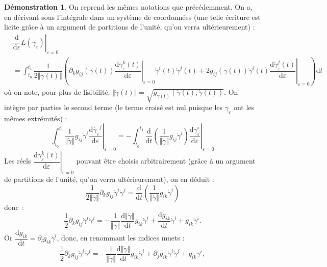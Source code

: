 \documentclass[12pt,a4paper]{article}
\theoremstyle{definition}
\newtheorem*{dem}{Démonstration}
\begin{document}
\begin{dem}
On reprend les mêmes notations que précédemment.\newline
On a, en dérivant sous l'intégrale dans un système de coordonnées (une telle écriture est licite grâce à un argument de partitions de l'unité, qu'on verra ultérieurement) :
\begin{align*}
&\left.\dfrac{\mathrm{d}}{\mathrm{d}\varepsilon}L(\gamma_\varepsilon)\right|_{\varepsilon=0}\\&=\int_{t_0}^{t_1}\dfrac{1}{2\Vert\dot{\gamma}(t)\Vert}\left(\partial_kg_{ij}(\gamma(t))\left.\dfrac{\mathrm{d}\gamma^k_\varepsilon(t)}{\mathrm{d}\varepsilon}\right|_{\varepsilon=0}\dot{\gamma}^i(t)\dot{\gamma}^j(t)+2g_{ij}(\gamma(t))\dot{\gamma}^i(t)\left.\dfrac{\mathrm{d}\dot{\gamma}_\varepsilon^j(t)}{\mathrm{d}\varepsilon}\right|_{\varepsilon=0}\right)\mathrm{d}t
\end{align*}
où on note, pour plus de lisibilité, $\Vert\dot{\gamma}(t)\Vert=\sqrt{g_{\gamma(t)}(\dot{\gamma}(t),\dot{\gamma}(t))}$.\newline
On intègre par parties le second terme (le terme croisé est nul puisque les $\gamma_\varepsilon$ ont les mêmes extrémités) :
$$\int_{t_0}^{t_1}\dfrac{1}{\Vert\dot{\gamma}\Vert}g_{ij}\dot{\gamma}^i\left.\dfrac{\mathrm{d}\dot{\gamma_\varepsilon}^j}{\mathrm{d}\varepsilon}\right|_{\varepsilon=0}=-\int_{t_0}^{t_1}\dfrac{\mathrm{d}}{\mathrm{d}t}\left(\dfrac{1}{\Vert\dot{\gamma}\Vert}g_{ij}\dot{\gamma}^i\right)\left.\dfrac{\mathrm{d}\gamma^i_\varepsilon}{\mathrm{d}\varepsilon}\right|_{\varepsilon=0}$$
Les réels $\left.\dfrac{\mathrm{d}\gamma_\varepsilon^k(t)}{\mathrm{d}\varepsilon}\right|_{\varepsilon=0}$ pouvant être choisis arbitrairement (grâce à un argument de partitions de l'unité, qu'on verra ultérieurement), on en déduit :
$$
\dfrac{1}{2\Vert\dot{\gamma}\Vert}\partial_kg_{ij}\dot{\gamma}^i\dot{\gamma}^j=
\dfrac{\mathrm{d}}{\mathrm{d}t}\left(\dfrac{1}{\Vert\dot{\gamma}\Vert}g_{ik}\dot{\gamma}^i\right)
$$
donc :
$$
\dfrac{1}{2}\partial_kg_{ij}\dot{\gamma}^i\dot{\gamma}^j=-\dfrac{1}{\Vert\dot{\gamma}\Vert}\dfrac{\mathrm{d}\Vert\dot{\gamma}\Vert}{\mathrm{d}t}g_{ik}\dot{\gamma}^i+\dfrac{\mathrm{d}g_{ik}}{\mathrm{d}t}\dot{\gamma}^i+g_{ik}\ddot{\gamma}^i.
$$
Or $\dfrac{\mathrm{d}g_{ik}}{\mathrm{d}t}=\partial_lg_{ik}\dot{\gamma}^l$, donc, en renommant les indices muets :
$$
\dfrac{1}{2}\partial_kg_{ij}\dot{\gamma}^i\dot{\gamma}^j=-\dfrac{1}{\Vert\dot{\gamma}\Vert}\dfrac{\mathrm{d}\Vert\dot{\gamma}\Vert}{\mathrm{d}t}g_{ik}\dot{\gamma}^i+\partial_jg_{ik}\dot{\gamma}^i\dot{\gamma}^j+g_{ik}\ddot{\gamma}^i,
$$
\end{dem}
\end{document}

